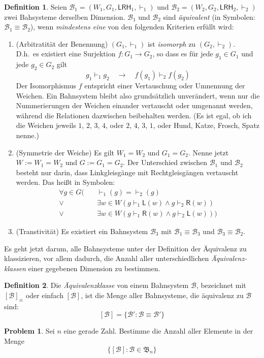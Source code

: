 \documentclass{article}
\theoremstyle{definition}
\newtheorem{defi}{Definition}
\newtheorem*{prob*}{Problem}
\newcommand{\lgang}{\mathsf{L}}
\newcommand{\rgang}{\mathsf{R}}
\newcommand{\connec}{\vdash}
\newcommand{\lrh}{\mathsf{LRH}}
\begin{document}
    \begin{defi}
	Seien $\mathcal{B}_1 = (W_1,G_1,\lrh_1,\connec_1)$ und $\mathcal{B}_2 = (W_2,G_2,\lrh_2,\connec_2)$ zwei Bahsysteme derselben Dimension. $\mathcal{B}_1$ und $\mathcal{B}_2$ sind \textit{äquivalent} (in Symbolen: $\mathcal{B}_1\equiv\mathcal{B}_2$), wenn \textit{mindestens eine} von den folgenden Kriterien erfüllt wird:

	\begin{enumerate}[label=\roman*., ref=(\roman*)]
	    \item (Arbitratität der Benennung) $(G_1,\connec_1)$ ist \textit{isomorph} zu $(G_2,\connec_2)$. D.h.\ es existiert eine Surjektion $f:G_1\to G_2$, so dass es für jede $g_1\in G_1$ und jede $g_2\in G_2$ gilt
		\[ g_1\connec_1 g_2 \quad\to\quad f(g_1)\connec_2 f(g_2) \]
		Der Isomorphismus $f$ entspricht einer Vertauschung oder Umnennung der Weichen. Ein Bahnsystem bleibt also grundsätzlich unverändert, wenn nur die Nummerierungen der Weichen einander vertauscht oder umgenannt werden, während die Relationen dazwischen beibehalten werden. (Es ist egal, ob ich die Weichen jeweils $1$, $2$, $3$, $4$, oder $2$, $4$, $3$, $1$, oder Hund, Katze, Frosch, Spatz nenne.)
	    \item (Symmetrie der Weiche) Es gilt $W_1=W_2$ und $G_1=G_2$. Nenne jetzt $W:=W_1=W_2$ und $G:=G_1=G_2$. Der Unterschied zwischen $\mathcal{B}_1$ und $\mathcal{B}_2$ besteht nur darin, dass Linkgleisgänge mit Rechtgleisgängen vertauscht werden. Das heißt in Symbolen:
		\begin{align*}
		    \forall g\in G (\quad&{\connec_1}(g) = {\connec_2}(g) \\
		    \lor\quad &\exists w\in W(g \connec_1 \lgang(w) \land g \connec_2 \rgang(w)) \\
		    \lor\quad &\exists w\in W(g \connec_1 \rgang(w) \land g \connec_2 \lgang(w)))
		\end{align*}
	    \item (Transtivität) Es existiert ein Bahnsystem $\mathcal{B}_3$ mit $\mathcal{B}_1 \equiv \mathcal{B}_3$ und $\mathcal{B}_3 \equiv \mathcal{B}_2$.
	\end{enumerate}
    \end{defi}

    Es geht jetzt darum, alle Bahnsysteme unter der Definition der Äquivalenz zu klassizieren, vor allem dadurch, die Anzahl aller unterschiedlichen \textit{Äquivalenz-klassen} einer gegebenen Dimension zu bestimmen.

    \begin{defi}
	Die \textit{Äquivalenzklasse} von einem Bahnsystem $\mathcal{B}$, bezeichnet mit $[\mathcal{B}]_\equiv$ oder einfach $[\mathcal{B}]$, ist die Menge aller Bahnsysteme, die äquivalenz zu $\mathcal{B}$ sind:
	\[ [\mathcal{B}] = \{\mathcal{B}':\mathcal{B}\equiv\mathcal{B}'\} \]
    \end{defi}
    
    \begin{prob*}
	Sei $n$ eine gerade Zahl. Bestimme die Anzahl aller Elemente in der Menge
	\[ \{ [\mathcal{B}] : \mathcal{B} \in \mathfrak{B}_n \} \]
    \end{prob*}
\end{document}

